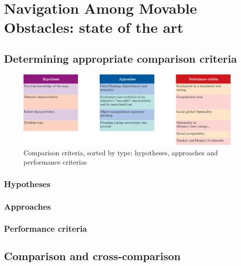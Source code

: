 
\chapter{Navigation Among Movable Obstacles: state of the art} %

\label{Chapter2} %

\section{Determining appropriate comparison criteria}

\begin{figure}[H]
\centering
\includegraphics[width=15cm]{Comparison_Table/comparison_criteria}
\decoRule
\caption[Comparison criteria listing]{Comparison criteria, sorted by type: hypotheses, approaches and performance criterias}
\label{fig:comparison_criteria}
\end{figure}

\subsection{Hypotheses}


\subsection{Approaches}


\subsection{Performance criteria}


\section{Comparison and cross-comparison}

